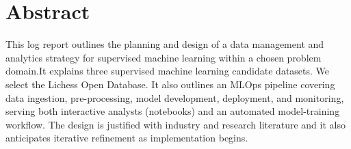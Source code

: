 \documentclass[11pt,a4paper]{report}
\begin{document}

\hypersetup{pageanchor=false}

\hypersetup{pageanchor=true}
\cleardoublepage

\chapter*{Abstract}
{}

This log report outlines the planning and design of a data management and analytics strategy for supervised machine learning within a chosen problem domain.It explains three supervised machine learning candidate datasets. We select the Lichess Open Database. It also outlines an MLOps pipeline covering data ingestion, pre-processing, model development, deployment, and monitoring, serving both interactive analysts (notebooks) and an automated model-training workflow. The design is justified with industry and research literature and it also anticipates iterative refinement as implementation begins.


\tableofcontents
\clearpage

\listoffigures
\listoftables
\clearpage







\appendix

\begingroup
\singlespacing
\small
\setlength{\parskip}{0.25ex plus 0.1ex}
\makeatletter
\renewcommand\section{\@startsection{section}{1}{\z@}{-0.75ex \@plus -0.2ex}{0.4ex}{\normalfont\bfseries\small}}
\makeatother


\endgroup

\printbibliography[heading=bibintoc]
\end{document}
